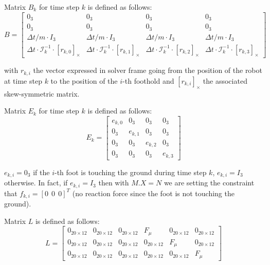 \documentclass[a4paper,11pt]{article}
\begin{document}
Matrix $B_k$ for time step $k$ is defined as follows:
\begin{equation}
B = \begin{bmatrix} 
0_3 & 0_3 & 0_3 & 0_3 \\
0_3 & 0_3 & 0_3 & 0_3 \\
\Delta t/m \cdot I_3 & \Delta t/m \cdot I_3 & \Delta t/m \cdot I_3 & \Delta t/m \cdot I_3 \\
\Delta t \cdot \mathcal{I}_k^{-1} \cdot [r_{k,0}]_\times & \Delta t \cdot \mathcal{I}_k^{-1} \cdot [r_{k,1}]_\times & \Delta t \cdot \mathcal{I}_k^{-1} \cdot [r_{k,2}]_\times & \Delta t \cdot \mathcal{I}_k^{-1} \cdot [r_{k,3}]_\times
\end{bmatrix}
\end{equation}

with $r_{k,i}$ the vector expressed in solver frame going from the position of the robot at time step $k$ to the position of the $i$-th foothold and $[r_{k,i}]_\times$ the associated skew-symmetric matrix.

Matrix $E_k$ for time step $k$ is defined as follows:
\begin{equation}
E_k = \begin{bmatrix} 
e_{k,0} & 0_3 & 0_3 & 0_3 \\
0_3 & e_{k,1} & 0_3 & 0_3 \\
0_3 & 0_3 & e_{k,2} & 0_3 \\
0_3 & 0_3 & 0_3 & e_{k,3}
\end{bmatrix}
\end{equation}

$e_{k,i} = 0_3$ if the $i$-th foot is touching the ground during time step $k$, $e_{k,i} = I_3$ otherwise. In fact, if $e_{k,i} = I_3$ then with $M.X = N$ we are setting the constraint that $f_{k,i} = [0 ~~ 0 ~~ 0]^T$ (no reaction force since the foot is not touching the ground).

Matrix $L$ is defined as follows:
\begin{equation}
L = \begin{bmatrix} 
	0_{20\times12} & 0_{20\times12} & 0_{20\times12}  & F_\mu  & 0_{20\times12} & 0_{20\times12} \\
	0_{20\times12} & 0_{20\times12} & 0_{20\times12}  & 0_{20\times12} & F_\mu  & 0_{20\times12} \\
	0_{20\times12} & 0_{20\times12} & 0_{20\times12}  & 0_{20\times12} & 0_{20\times12} & F_\mu  \end{bmatrix}
\end{equation}
\end{document}
